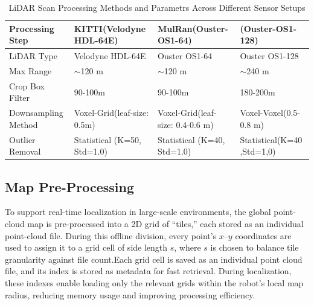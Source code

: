 \begin{table}[htbp]
\centering
\caption{LiDAR Scan Processing Methods and Parametrs  Across Different Sensor Setups}
\label{tab:lidar_preprocessing}
\begin{tabular}{|p{3.5cm}|p{3.5cm}|p{3.5cm}|p{3.5cm}|}
\hline
\textbf{Processing Step} & \textbf{KITTI(Velodyne HDL-64E)} & \textbf{MulRan(Ouster-OS1-64)} & \textbf{(Ouster-OS1-128)} \\
\hline
LiDAR Type & Velodyne HDL-64E & Ouster OS1-64 & Ouster OS1-128 \\
\hline
Max Range & $\sim$120 m & $\sim$120 m & $\sim$240 m \\
\hline
Crop Box Filter & 90-100m & 90-100m & 180-200m\\
\hline
Downsampling Method & Voxel-Grid(leaf-size: 0.5m) & Voxel-Grid(leaf-size: 0.4-0.6 m) & Voxel-Voxel(0.5-0.8 m) \\
\hline
Outlier Removal & Statistical (K=50, Std=1.0) & Statistical (K=40, Std=1.0) & Statistical(K=40 ,Std=1,0) \\
\hline
\end{tabular}
\end{table}

\subsection{Map Pre-Processing}

To support real-time localization in large-scale environments, the global point-cloud map is pre-processed into a 2D grid of “tiles,” each stored as an individual point-cloud file. During this offline division, every point’s \(x\)–\(y\) coordinates are used to assign it to a grid cell of side length \(s\), where \(s\) is chosen to balance tile granularity against file count.Each
grid cell is saved as an individual point cloud file, and its index is stored as metadata for fast
retrieval. During localization, these indexes enable loading only the relevant grids within the
robot’s local map radius, reducing memory usage and improving processing efficiency.



